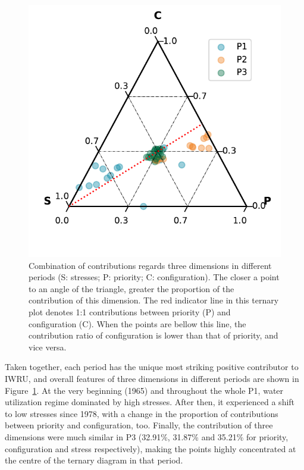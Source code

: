 \documentclass[9pt, twocolumn, twoside, lineno]{pnas-new}
\begin{document}
\begin{figure}[!htbp]
	\centering
	\includegraphics[width=0.9\linewidth]{../../figures/main/phases.pdf}
	\caption{Combination of contributions regards three dimensions in different periods (S: stresses; P: priority; C: configuration). The closer a point to an angle of the triangle, greater the proportion of the contribution of this dimension.
	The red indicator line in this ternary plot denotes 1:1 contributions between priority (P) and configuration (C). When the points are bellow this line, the contribution ratio of configuration is lower than that of priority, and vice versa.}
	\label{fig:phases}
\end{figure}

Taken together, each period has the unique most striking positive contributor to IWRU, and overall features of three dimensions in different periods are shown in Figure~\ref{fig:phases}.
At the very beginning (1965) and throughout the whole P1, water utilization regime dominated by high stresses. After then, it experienced a shift to low stresses since 1978, with a change in the proportion of contributions between priority and configuration, too.
Finally, the contribution of three dimensions were much similar in P3 (32.91\%, 31.87\% and 35.21\% for priority, configuration and stress respectively), making the points highly concentrated at the centre of the ternary diagram in that period.
\end{document}
